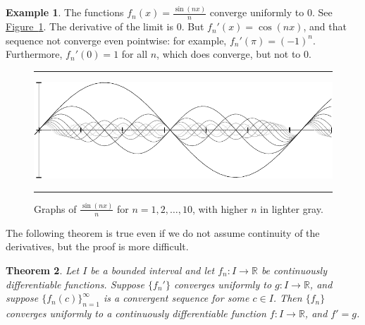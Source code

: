 \documentclass[12pt,openany]{book}
\newcommand{\R}{{\mathbb{R}}}
\theoremstyle{plain}
\newtheorem{thm}{Theorem}[section]
\theoremstyle{remark}
\theoremstyle{definition}
\newenvironment{myfig}{%
\begin{figure}[h!t]
\noindent\rule{\textwidth}{0.5pt}\vspace{12pt}\par\centering}%
{\par\noindent\rule{\textwidth}{0.5pt}
\end{figure}}
\theoremstyle{exercise}
\theoremstyle{example}
\newtheorem{example}[thm]{Example}
\newcommand{\figureref}[1]{\hyperref[#1]{Figure~\ref*{#1}}}
\begin{document}
\begin{example}
The functions $f_n(x) = \frac{\sin(nx)}{n}$
converge uniformly to $0$.
See \figureref{fig:conv1nsinxn}.
The derivative of the limit is $0$.
But $f_n'(x) = \cos(nx)$,
and that sequence not converge even pointwise:
for example, $f_n'(\pi) = {(-1)}^n$.
Furthermore, $f_n'(0) = 1$ for all $n$, which does converge, but not to $0$.
\begin{myfig}
\includegraphics{figures/conv1nsinxn}
\caption{Graphs of $\frac{\sin(nx)}{n}$ for
$n=1,2,\ldots,10$, with higher $n$ in lighter gray.%
\label{fig:conv1nsinxn}}
\end{myfig}
\end{example}

The following theorem is true even if 
we do not assume continuity of the derivatives, but the proof is more
difficult.

\begin{thm} \label{thm:dersconverge}
Let $I$ be a bounded interval and let
$f_n \colon I \to \R$ be continuously differentiable functions.
Suppose $\{ f_n' \}$ converges uniformly to $g \colon I \to \R$,
and suppose $\{ f_n(c) \}_{n=1}^\infty$ is a
convergent sequence for some $c \in I$.  Then $\{ f_n \}$ converges uniformly to 
a continuously differentiable function $f \colon I \to \R$, and $f' = g$.
\end{thm}
\end{document}
